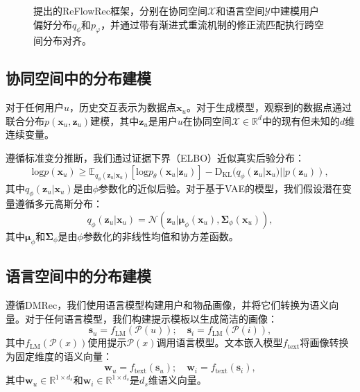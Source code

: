 \documentclass[sigconf]{acmart}
\begin{document}
\begin{figure}[t]
\setlength{\abovecaptionskip}{0.1cm}
\setlength{\belowcaptionskip}{0.1cm} 
\centering
\caption{
提出的\textsf{ReFlowRec}框架，分别在协同空间$\mathcal X$和语言空间$\mathcal Y$中建模用户偏好分布$q_\phi$和$p_\varphi$，并通过带有渐进式重流机制的修正流匹配执行跨空间分布对齐。}
\label{fig_model}
\end{figure}

\subsection{协同空间中的分布建模}
对于任何用户$u$，历史交互表示为数据点$\mathbf x_u$。对于生成模型，观察到的数据点通过联合分布$p(\mathbf x_u, \mathbf z_u)$建模，其中$\mathbf z_u$是用户$u$在协同空间$\mathcal X \in \mathbb R^{d}$中的现有但未知的$d$维连续变量。

遵循标准变分推断\cite{kingma2013auto, liang2018variational}，我们通过证据下界（ELBO）近似真实后验分布：
\begin{equation}
\label{elbo}
\text{log}p(\mathbf x_u) \ge \mathbb E_{q_{\phi}(\mathbf z_u|\mathbf x_u)}[\text{log}p_{\theta}(\mathbf x_u|\mathbf z_u)] - \text{D}_{\text{KL}}(q_{\phi}(\mathbf z_u|\mathbf x_u)||p(\mathbf z_u)),
\end{equation}
其中$q_{\phi}(\mathbf z_u|\mathbf x_u)$是由$\phi$参数化的近似后验。对于基于VAE的模型，我们假设潜在变量遵循多元高斯分布：
\begin{equation}
\label{vae_q}
q_{\phi}(\mathbf z_u|\mathbf x_u)=\mathcal N\left (\mathbf z_u|\boldsymbol\mu_\phi(\mathbf x_u), \boldsymbol\Sigma_{\phi}(\mathbf x_u)\right),
\end{equation}
其中$\boldsymbol\mu_\phi$和$\boldsymbol\Sigma_{\phi}$是由$\phi$参数化的非线性均值和协方差函数。

\subsection{语言空间中的分布建模}
遵循DMRec\cite{zhang2024dmrec}，我们使用语言模型构建用户和物品画像，并将它们转换为语义向量。对于任何语言模型，我们构建提示模板以生成简洁的画像：
\begin{equation}
\label{prompt}
\mathbf s_u=f_{\text{LM}}(\mathcal P(u)); \quad \mathbf s_i=f_{\text{LM}}(\mathcal P(i)),
\end{equation}
其中$f_{\text{LM}}(\mathcal P(x))$使用提示$\mathcal P(x)$调用语言模型。文本嵌入模型$f_\text{text}$\cite{su2023one}将画像转换为固定维度的语义向量：
\begin{equation}
\label{text_embedding}
\mathbf w_u = f_\text{text}(\mathbf s_u); \quad \mathbf w_i=f_\text{text}(\mathbf s_i),
\end{equation}
其中$\mathbf w_u \in \mathbb R^{1\times d_s}$和$\mathbf w_i \in \mathbb R^{1\times d_s}$是$d_s$维语义向量。
\end{document}
